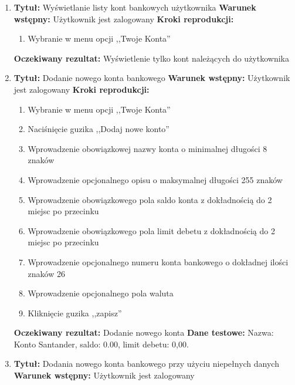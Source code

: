 \begin{enumerate}[labelwidth=1em,label=\Roman*]
\item 
    \textbf{Tytuł:} Wyświetlanie listy kont bankowych użytkownika \newline
    \textbf{Warunek wstępny:} Użytkownik jest zalogowany \newline
    \textbf{Kroki reprodukcji:}  \begin{enumerate}[label=\arabic*.]
        \item Wybranie w menu opcji ,,Twoje Konta''
    \end{enumerate}
    \textbf{Oczekiwany rezultat:}  Wyświetlenie tylko kont należących do użytkownika \newline
\item 
    \textbf{Tytuł:} Dodanie nowego konta bankowego \newline
    \textbf{Warunek wstępny:} Użytkownik jest zalogowany \newline
    \textbf{Kroki reprodukcji:}  \begin{enumerate}[label=\arabic*.]
        \item Wybranie w menu opcji ,,Twoje Konta''
        \item Naciśnięcie guzika ,,Dodaj nowe konto''
        \item Wprowadzenie obowiązkowej nazwy konta o minimalnej długości 8 znaków
        \item Wprowadzenie opcjonalnego opisu o maksymalnej długości 255 znaków
        \item Wprowadzenie obowiązkowego pola saldo konta z dokładnością do 2 miejsc po przecinku
        \item Wprowadzenie obowiązkowego pola limit debetu z dokładnością do 2 miejsc po przecinku
        \item Wprowadzenie opcjonalnego numeru konta bankowego o dokładnej ilości znaków 26
        \item Wprowadzenie opcjonalnego pola waluta
        \item Kliknięcie guzika ,,zapisz''
    \end{enumerate}
    \textbf{Oczekiwany rezultat:}  Dodanie nowego konta \newline
    \textbf{Dane testowe:} Nazwa: Konto Santander, saldo:  0.00, limit debetu: 0,00. 
\item
    \textbf{Tytuł:} Dodania nowego konta bankowego przy użyciu niepełnych danych \newline
    \textbf{Warunek wstępny:} Użytkownik jest zalogowany \newline

\end{enumerate}
